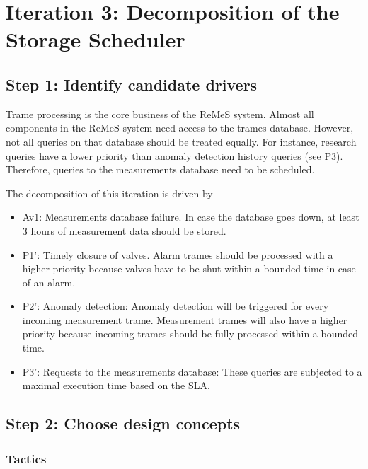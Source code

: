 \section{Iteration 3: Decomposition of the Storage Scheduler}
\label{add:it3}

\subsection{Step 1: Identify candidate drivers}
\label{add:it3/drivers}

\npar Trame processing is the core business of the ReMeS system. Almost all
components in the ReMeS system need access to the trames database.
However, not all queries on that database should be treated equally. For
instance, research queries have a lower priority than anomaly detection history
queries (see P3). Therefore, queries to the measurements database need to be
scheduled.

\npar The decomposition of this iteration is driven by

\begin{itemize}
  	\item Av1: Measurements database failure. In case the database goes down, at
  	least 3 hours of measurement data should be stored.
	\item P1': Timely closure of valves. Alarm trames should be processed with a
	higher priority because valves have to be shut within a bounded time in case of
	an alarm.
	\item P2': Anomaly detection: Anomaly detection will be triggered for every
	incoming measurement trame. Measurement trames will also have a higher
	priority because incoming trames should be fully processed within a bounded
	time.
	\item P3': Requests to the measurements database: These queries are subjected
	to a maximal execution time based on the SLA. 
\end{itemize}


\subsection{Step 2: Choose design concepts}
\label{add:it3/concepts}

\subsubsection{Tactics}
\label{add:it3/tactics}


